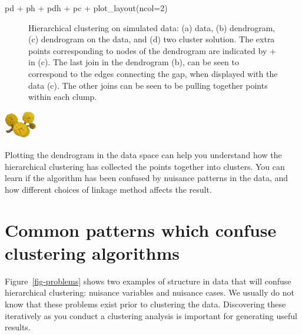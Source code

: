 \documentclass[
  letterpaper,
]{krantz}
\newenvironment{Shaded}{\begin{snugshade}}{\end{snugshade}}
\newcommand{\AttributeTok}[1]{\textcolor[rgb]{0.40,0.45,0.13}{#1}}
\newcommand{\DecValTok}[1]{\textcolor[rgb]{0.68,0.00,0.00}{#1}}
\newcommand{\FunctionTok}[1]{\textcolor[rgb]{0.28,0.35,0.67}{#1}}
\newcommand{\NormalTok}[1]{\textcolor[rgb]{0.00,0.23,0.31}{#1}}
\newcommand{\SpecialCharTok}[1]{\textcolor[rgb]{0.37,0.37,0.37}{#1}}
\newcommand{\infobox}[1]{%
\noindent\colorbox{info!30}{%
\begin{minipage}{0.98\linewidth}%
    \centering%
    \begin{minipage}[c]{0.15\linewidth} %
      \includegraphics[width=1.5cm]{images/mulga-flowers2.png} %
    \end{minipage}%
    \hfill %
    \begin{minipage}[c]{0.8\linewidth} %
      \bigskip%
      \textsf{#1}%
      \bigskip%
    \end{minipage}%
    \hspace*{3mm}%
  \end{minipage}%
}%
}
\begin{document}
\begin{Shaded}
\begin{Highlighting}[]
\NormalTok{pd }\SpecialCharTok{+}\NormalTok{ ph }\SpecialCharTok{+}\NormalTok{ pdh }\SpecialCharTok{+}\NormalTok{ pc }\SpecialCharTok{+} \FunctionTok{plot\_layout}\NormalTok{(}\AttributeTok{ncol=}\DecValTok{2}\NormalTok{)}
\end{Highlighting}
\end{Shaded}

\begin{figure}[H]


\caption{\label{fig-hc-sim}Hierarchical clustering on simulated data:
(a) data, (b) dendrogram, (c) dendrogram on the data, and (d) two
cluster solution. The extra points corresponding to nodes of the
dendrogram are indicated by + in (c). The last join in the dendrogram
(b), can be seen to correspond to the edges connecting the gap, when
displayed with the data (c). The other joins can be seen to be pulling
together points within each clump.}

\end{figure}%

\infobox{Plotting the dendrogram in the data space can help you understand how the hierarchical clustering has collected the points together into clusters. You can learn if the algorithm has been confused by nuisance patterns in the data, and how different choices of linkage method affects the result.}

\section{Common patterns which confuse clustering
algorithms}\label{common-patterns-which-confuse-clustering-algorithms}

Figure~\ref{fig-problems} shows two examples of structure in data that
will confuse hierarchical clustering: nuisance variables and nuisance
cases. We usually do not know that these problems exist prior to
clustering the data. Discovering these iteratively as you conduct a
clustering analysis is important for generating useful results.
\end{document}
